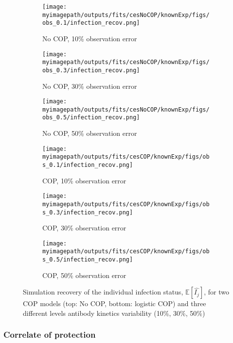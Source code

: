 \begin{figure}[H]
    \centering
    \begin{subfigure}{0.31\textwidth}
        \centering
        \texttt{[image: \\myimagepath/outputs/fits/cesNoCOP/knownExp/figs/obs\_0.1/infection\_recov.png]}
        \caption{No COP, 10\% observation error \label{fit1:infA}}
    \end{subfigure}
    \begin{subfigure}{0.31\textwidth}
        \centering
        \texttt{[image: \\myimagepath/outputs/fits/cesNoCOP/knownExp/figs/obs\_0.3/infection\_recov.png]}
        \caption{No COP, 30\% observation error \label{fit1:infB}}
    \end{subfigure}
    \begin{subfigure}{0.31\textwidth}
        \centering
        \texttt{[image: \\myimagepath/outputs/fits/cesNoCOP/knownExp/figs/obs\_0.5/infection\_recov.png]}
        \caption{No COP, 50\% observation error \label{fit1:infC}}
    \end{subfigure}
    
  \begin{subfigure}{0.31\textwidth}
        \centering
        \texttt{[image: \\myimagepath/outputs/fits/cesCOP/knownExp/figs/obs\_0.1/infection\_recov.png]}
        \caption{ COP, 10\% observation error \label{fit1:infD}}
    \end{subfigure}
    \begin{subfigure}{0.31\textwidth}
        \centering
        \texttt{[image: \\myimagepath/outputs/fits/cesCOP/knownExp/figs/obs\_0.3/infection\_recov.png]}
        \caption{ COP, 30\% observation error \label{fit1:infE}}
    \end{subfigure}
    \begin{subfigure}{0.31\textwidth}
        \centering
        \texttt{[image: \\myimagepath/outputs/fits/cesCOP/knownExp/figs/obs\_0.5/infection\_recov.png]}
        \caption{ COP, 50\% observation error \label{fit1:infF}}
    \end{subfigure}
    
    \caption{Simulation recovery of the individual infection status, $\mathbb{E}[\hat{I_j}]$, for two COP models (top: No COP, bottom: logistic COP) and three different levels antibody kinetics variability (10\%, 30\%, 50\%) \label{fit1:inf}}
\end{figure}


\subsubsection{Correlate of protection}


